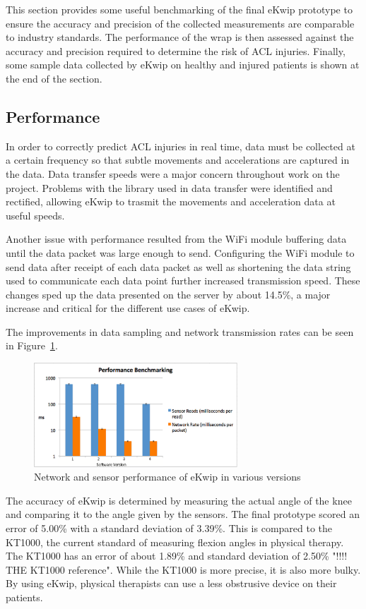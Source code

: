 This section provides some useful benchmarking of the final eKwip prototype to ensure the accuracy and precision of the collected measurements are comparable to industry standards. The performance of the wrap is then assessed against the accuracy and precision required to determine the risk of ACL injuries. Finally, some sample data collected by eKwip on healthy and injured patients is shown at the end of the section.

\subsection {Performance}
In order to correctly predict ACL injuries in real time, data must be collected at a certain frequency so that subtle movements and accelerations are captured in the data. Data transfer speeds were a major concern throughout work on the project. Problems with the library used in data transfer were identified and rectified, allowing eKwip to trasmit the movements and acceleration data at useful speeds.

Another issue with performance resulted from the WiFi module buffering data until the data packet was large enough to send.  Configuring the WiFi module to send data after receipt of each data packet as well as shortening the data string used to communicate each data point further increased transmission speed. These changes sped up the data presented on the server by about 14.5\%, a major increase and critical for the different use cases of eKwip. 

The improvements in data sampling and network transmission rates can be seen in Figure~\ref{fig:graph}.

\begin{figure}[h]
  \begin{center}
    \includegraphics[width=3in]{images/graph.png}
  \end{center}
  \caption{Network and sensor performance of eKwip in various versions}
  \label{fig:graph}
\end{figure}


The accuracy of eKwip is determined by measuring the actual angle of the knee and comparing it to the angle given by the sensors. The final prototype scored an error of 5.00\% with a standard deviation of 3.39\%. This is compared to the KT1000, the current standard of measuring flexion angles in physical therapy. The KT1000 has an error of about 1.89\% and standard deviation of 2.50\% "!!!! THE KT1000 reference". While the KT1000 is more precise, it is also more bulky. By using eKwip, physical therapists can use a less obstrusive device on their patients.

